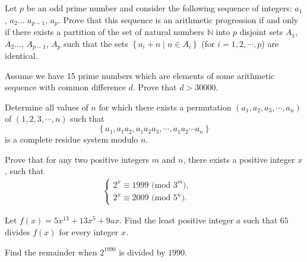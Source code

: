 \documentclass{subfile}
\begin{document}
	\begin{problem} %
		Let $p$ be an odd prime number and consider the following sequence of integers: $a_1$, $a_2\ldots$ $a_{p-1}$, $a_p$. Prove that this sequence is an arithmetic progression if and only if there exists a partition of the set of natural numbers $\mathbb{N}$ into $p$ disjoint sets $A_1$, $A_2\ldots$, $A_{p-1}$, $A_p$ such that the sets $\left\{ a_i+n\mid n\in A_i\right\}$ (for $i=1, 2,\cdots, p$) are identical.
	\end{problem}

	\begin{problem} %
		Assume we have 15 prime numbers which are elements of some arithmetic sequence with common difference $d$. Prove that $d>30000$.
	\end{problem}

	\begin{problem} %
		Determine all values of $n$ for which there exists a permutation $(a_1,a_2,a_3,\cdots,a_n)$ of $(1,2,3,\cdots,n)$ such that $$\left\{ {{a_1},{a_1}{a_2},{a_1}{a_2}{a_3},\cdots,{a_1}{a_2}\cdots{a_n}} \right\}$$ is a complete residue system modulo $n$.
	\end{problem}

	\begin{problem} %
		Prove that for any two positive integers $m$ and $n$, there exists a positive integer $x$, such that
			\begin{align*}
				\left\{\begin{matrix} 2^x \equiv 1999 \text{ (mod }3^m), & & \\ 2^x \equiv 2009 \text{ (mod }5^n). & & \end{matrix}\right.
			\end{align*}
	\end{problem}

	\begin{problem} %
		Let $f(x) = 5 x^{13} + 13 x^5 + 9ax$. Find the least positive integer $a$ such that $65$ divides $f(x)$ for every integer $x$.
	\end{problem}

	\begin{problem} %
		Find the remainder when $2^{1990}$ is divided by $1990$.
	\end{problem}
\end{document}
